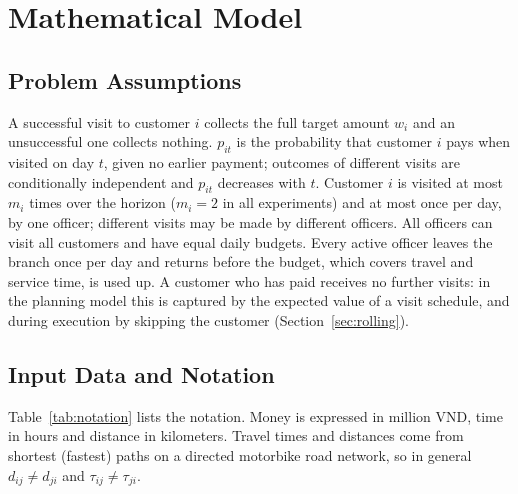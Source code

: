 \documentclass[11pt,a4paper]{article}
\begin{document}
\section{Mathematical Model}
\label{sec:model}

\subsection{Problem Assumptions}
A successful visit to customer $i$ collects the full target amount $w_i$ and
an unsuccessful one collects nothing. $p_{it}$ is the probability that
customer $i$ pays when visited on day $t$, given no earlier payment; outcomes
of different visits are conditionally independent and $p_{it}$ decreases
with $t$. Customer $i$ is visited at most $m_i$ times over the horizon
($m_i=2$ in all experiments) and at most once per day, by one officer;
different visits may be made by different officers. All officers can visit
all customers and have equal daily budgets. Every active officer leaves the
branch once per day and returns before the budget, which covers travel and
service time, is used up. A customer who has paid receives no further
visits: in the planning model this is captured by the expected value of a
visit schedule, and during execution by skipping the customer
(Section~\ref{sec:rolling}).

\subsection{Input Data and Notation}
Table~\ref{tab:notation} lists the notation. Money is expressed in
million VND, time in hours and distance in kilometers. Travel times and
distances come from shortest (fastest) paths on a directed motorbike road
network, so in general $d_{ij}\ne d_{ji}$ and $\tau_{ij}\ne\tau_{ji}$.
\end{document}
